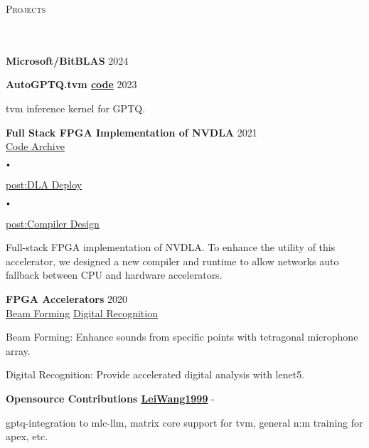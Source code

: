\documentclass{article}
\newcommand{\header}[1]{{
\hspace*{-15pt}\vspace*{6pt} \textsc{#1}} \vspace*{-6pt} 
\lineunder
}
\newcommand{\lineunder}{
\vspace*{-8pt} \\ \hspace*{-18pt} 
\hrulefill \\
}
\newcommand{\project}[3]{{
\vspace*{2pt}%
\textbf{#1} \hfill #2\\ #3 \vspace*{2pt}}
}
\renewcommand{\labelitemi}{
$\vcenter{\hbox{\tiny$\bullet$}}$\hspace*{3pt}
}
\renewcommand{\labelitemii}{
$\vcenter{\hbox{\tiny$\bullet$}}$\hspace*{-3pt}
}
\newcommand{\myhref}[2]{%
\href{#1}{\textcolor{ColorTwo}{#2}}
}
\newenvironment{bullet-list-minor}{
\begin{list}{\labelitemii}{\setlength\leftmargin{15pt} 
\topsep 0pt \itemsep -2pt}}{\vspace*{4pt}\end{list}
}
\begin{document}
\vspace*{4pt}%
\header{Projects}
    \project{Microsoft/BitBLAS}{2024}{}
    \project{AutoGPTQ.tvm\textcolor{ColorTwo}{\faGithub} 
\myhref{https://github.com/LeiWang1999/AutoGPTQ.tvm}{code}}{2023}{}
    \begin{bullet-list-minor}
	\item tvm inference kernel for GPTQ.
    \end{bullet-list-minor}
    \project{Full Stack FPGA Implementation of NVDLA}{2021}{
    \textcolor{ColorTwo}{\faGithub} 
\myhref{https://github.com/LeiWang1999/ZYNQ-NVDLA}{Code Archive}
    \labelitemi
    \textcolor{ColorTwo}{\faBook} 
\myhref{https://zhuanlan.zhihu.com/p/378202360}{post:DLA Deploy}
    \labelitemi
        \textcolor{ColorTwo}{\faBook} 
    \myhref{https://zhuanlan.zhihu.com/p/401943271}{post:Compiler Design}
}
	\begin{bullet-list-minor}
	\item Full-stack FPGA implementation of NVDLA. To enhance the utility of this accelerator, we designed a new compiler and runtime to allow networks auto fallback between CPU and hardware
                accelerators.
    \end{bullet-list-minor}
    \project{FPGA Accelerators}{2020}{
    \textcolor{ColorTwo}{\faVideoCamera} 
    \myhref{https://leiblog.wang/ZYNQ\%E5\%A3\%B0\%E6\%BA\%90\%E5\%AE\%9A\%E4\%BD\%8D\%E6\%B3\%A2\%E6\%9D\%9F\%E5\%BD\%A2\%E6\%88\%90/}{Beam Forming} \textcolor{ColorTwo}{\faVideoCamera} 
    \myhref{https://leiblog.wang/FPGA\%E8\%BD\%A6\%E7\%89\%8C\%E8\%AF\%86\%E5\%88\%AB/}{Digital Recognition}
    }
	\begin{bullet-list-minor}
	\item Beam Forming: Enhance sounds from specific points with tetragonal microphone array.
	\item Digital Recognition: Provide accelerated digital analysis with lenet5.
    \end{bullet-list-minor}
    \project{Opensource Contributions     \textcolor{ColorTwo}{\faGithub} 
    \myhref{https://github.com/LeiWang1999}{LeiWang1999}}{-}{
}
	\begin{bullet-list-minor}
	\item gptq-integration to mlc-llm, matrix core support for tvm, general n:m training for apex, etc.
    \end{bullet-list-minor}
 
\end{document}
